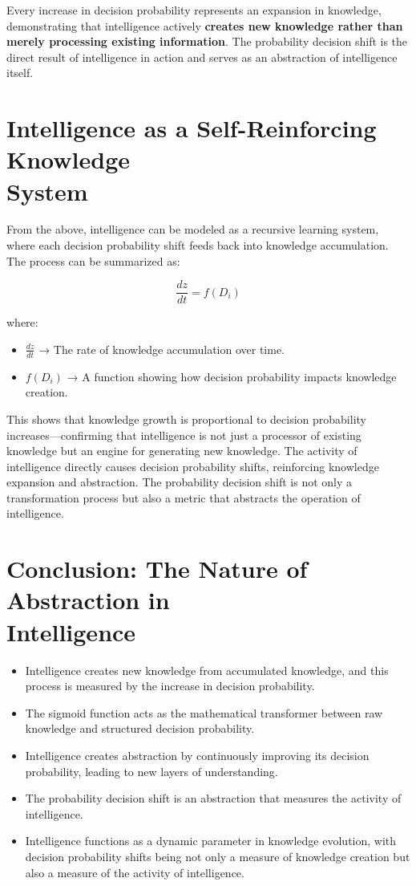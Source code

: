 \documentclass{article}
\newcommand{\no}{\noindent}
\begin{document}
\no
Every increase in decision probability represents an expansion in knowledge, demonstrating that intelligence actively {\bf creates new knowledge rather than merely processing existing information}. The probability decision shift is the direct result of intelligence in action and serves as an abstraction of intelligence itself.

\section{Intelligence as a Self-Reinforcing Knowledge\\ System}
From the above, intelligence can be modeled as a recursive learning system, where each decision probability shift feeds back into knowledge accumulation. The process can be summarized as:

$$
\frac{dz}{dt} = f(D_i)
$$

\no
where:
\begin{itemize}
\item  $\displaystyle \frac{dz}{dt}$ → The rate of knowledge accumulation over time.
\item $f(D_i)$ → A function showing how decision probability impacts knowledge creation.
\end{itemize}

\no
This shows that knowledge growth is proportional to decision probability increases---confirming that intelligence is not just a processor of existing knowledge but an engine for generating new knowledge. The activity of intelligence directly causes decision probability shifts, reinforcing knowledge expansion and abstraction. The probability decision shift is not only a transformation process but also a metric that abstracts the operation of intelligence.

\section{Conclusion: The Nature of Abstraction in\\ Intelligence}

\begin{itemize}
\item  Intelligence creates new knowledge from accumulated knowledge, and this process is measured by the increase in decision probability.
\item The sigmoid function acts as the mathematical transformer between raw knowledge and structured decision probability.
\item  Intelligence creates abstraction by continuously improving its decision probability, leading to new layers of understanding.
\item The probability decision shift is an abstraction that measures the activity of intelligence.
\item Intelligence functions as a dynamic parameter in knowledge evolution, with decision probability shifts being not only a measure of knowledge creation but also a measure of the activity of intelligence.
\end{itemize}
\end{document}
